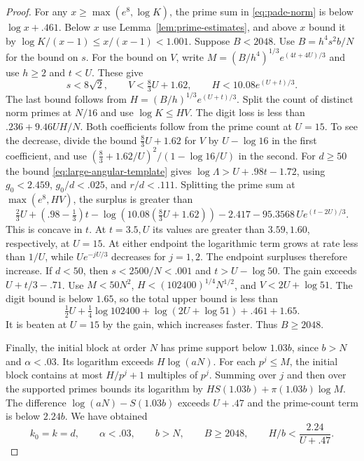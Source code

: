 \begin{proof}
For any \(x\ge\max(e^8,\log K)\), the prime sum in
\eqref{eq:pade-norm} is below \(\log x+.461\). Below \(x\)
use Lemma~\ref{lem:prime-estimates}, and above \(x\) bound it
by \(\log K/(x-1)\le x/(x-1)<1.001\).
Suppose \(B<2048\). Use \(B=h^4s^2b/N\) for the bound on \(s\). For the bound
on \(V\), write \(M=(B/h^4)^{1/3}e^{(4t+4U)/3}\) and
use \(h\ge2\) and \(t<U\). These give
\[
 s<8\sqrt2,\qquad V<\tfrac83U+1.62,\qquad
 H<10.08e^{(U+t)/3}.
\]
The last bound follows from \(H=(B/h)^{1/3}e^{(U+t)/3}\).
Split the count of distinct norm primes at \(N/16\)
and use \(\log K\le HV\). The digit loss is less than
\(.236+9.46UH/N\). Both coefficients follow from the prime count at \(U=15\).
To see the decrease, divide the bound \(\tfrac83U+1.62\)
for \(V\) by \(U-\log16\) in the first coefficient, and use
\((\tfrac83+1.62/U)^2/(1-\log16/U)\) in the second.
For \(d\ge50\) the bound \eqref{eq:large-angular-template} gives
\(\log\Lambda>U+.98t-1.72\), using \(g_0<2.459\),
\(g_0/d<.025\), and \(r/d<.111\).
Splitting the prime sum at \(\max(e^8,HV)\), the surplus is
greater than
\[
 \tfrac23 U+(.98-\tfrac13)t
 -\log(10.08(\tfrac83 U+1.62))-2.417
 -95.3568\,Ue^{(t-2U)/3}.
\]
This is concave in \(t\). At \(t=3.5,U\) its values are
greater than \(3.59,1.60\), respectively, at \(U=15\).
At either endpoint the logarithmic term grows at rate less
than \(1/U\), while \(Ue^{-jU/3}\) decreases for \(j=1,2\).
The endpoint surpluses therefore increase. If \(d<50\), then \(s<2500/N<.001\)
and \(t>U-\log50\). The gain exceeds \(U+t/3-.71\).
Use \(M<50N^2\), \(H<(102400)^{1/4}N^{1/2}\), and
\(V<2U+\log51\). The digit bound is below \(1.65\), so
the total upper bound is less than
\[
 \tfrac12U+\tfrac14\log102400+\log(2U+\log51)+.461+1.65.
\]
It is beaten at \(U=15\) by the gain, which increases faster.
Thus \(B\ge2048\).

Finally, the initial block at order \(N\) has prime support
below \(1.03b\), since \(b>N\) and \(\alpha<.03\).
Its logarithm exceeds \(H\log(aN)\). For each \(p^j\le M\), the initial block contains at most
\(H/p^j+1\) multiples of \(p^j\). Summing over \(j\) and
then over the supported primes bounds its logarithm by
\(H S(1.03b)+\pi(1.03b)\log M\).
The difference \(\log(aN)-S(1.03b)\) exceeds \(U+.47\)
and the prime-count term is below \(2.24b\). We have obtained
\begin{equation}\label{eq:large-parameter-range}
 k_0=k=d,\qquad \alpha<.03,\qquad b>N,\qquad
 B\ge2048,\qquad H/b<\frac{2.24}{U+.47}.
\end{equation}


\end{proof}
